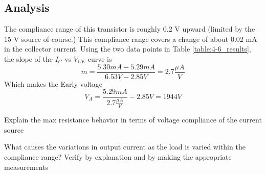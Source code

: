 \documentclass[12pt,letterpaper]{report}
\begin{document}
\subsection*{Analysis}
The compliance range of this transistor is roughly 0.2 V upward (limited by the 15 V source of course.) This compliance range covers a change of about 0.02 mA in the collector current. Using the two data points in Table \ref{table:4-6_results}, the slope of the $I_C$ vs $V_{CE}$ curve is
$$
m = \frac{5.30 mA - 5.29 mA}{6.53V - 2.85V} = 2.7 \frac{\mu A}{V}
$$
Which makes the Early voltage
$$
V_A = \frac{5.29 mA}{2.7 \frac{\mu A}{V}} - 2.85 V = 1944 V
$$

Explain the max resistance behavior in terms of voltage compliance of the current source

What causes the variations in output current as the load is varied within the compliance range? Verify by explanation and by making the appropriate measurements
\end{document}
